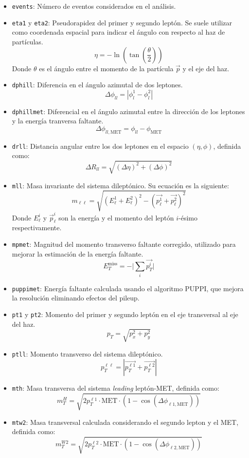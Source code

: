 \begin{itemize}
    \item[\ding{220}] \texttt{events}: Número de eventos considerados en el análisis.

    \item[\ding{220}] \texttt{eta1} y \texttt{eta2}: Pseudorapidez del primer y segundo leptón. Se suele utilizar como coordenada espacial para indicar el ángulo con respecto al haz de partículas. 
    $$
    \eta = -\ln \left( \tan \left( \frac{\theta}{2}\right) \right)
    $$
    Donde $\theta$ es el ángulo entre el momento de la partícula $\vec{p}$ y el eje del haz.
    \item[\ding{220}] \texttt{dphill}: Diferencia en el ángulo azimutal de dos leptones.
    $$
    \Delta \phi_{ll} = |\phi_l^1-\phi_l^2|
    $$
    \item[\ding{220}] \texttt{dphillmet}: Diferencial en el ángulo azimutal entre la dirección de los leptones y la energía tranversa faltante.
    $$
    \Delta \phi_{ll,\text{MET}} = \phi_{ll}-\phi_\text{MET}
    $$
    \item[\ding{220}] \texttt{drll}: Distancia angular entre los dos leptones en el espacio $(\eta, \phi)$, definida como:
    $$
    \Delta R_{ll} = \sqrt{(\Delta \eta)^2+(\Delta \phi)^2}
    $$
    \item[\ding{220}] \texttt{mll}: Masa invariante del sistema dileptónico. Su ecuación es la siguiente:
    $$
    m_{\ell \ell} = \sqrt{(E_{\ell}^1 + E_\ell^2)^2-(\vec{p_\ell^1}+\vec{p_\ell^2})^2}
    $$
    Donde $E_\ell^i$ y $\vec{p}_\ell^i$ son la energía y el momento del leptón $i$-ésimo respectivamente.
    \item[\ding{220}] \texttt{mpmet}:  Magnitud del momento transverso faltante corregido, utilizado para mejorar la estimación de la energía faltante.
    $$
    E_T^{\text{miss}} = -\Bigg| \sum_i \vec{p_T^i} \Bigg|
    $$
    \item[\ding{220}] \texttt{puppimet}: Energía faltante calculada usando el algoritmo PUPPI, que mejora la resolución eliminando efectos del pileup.
    \item[\ding{220}] \texttt{pt1} y \texttt{pt2}: Momento del primer y segundo leptón en el eje transversal al eje del haz.
    $$
    p_T = \sqrt{p_x^2+p_y^2}
    $$
    \item[\ding{220}] \texttt{ptll}: Momento transverso del sistema dileptónico.
    $$
    p_T^{\ell \ell} = |\vec{p_T^{\ell 1}} + \vec{p_T^{\ell 2}}|
    $$
    \item[\ding{220}] \texttt{mth}: Masa transversa del sistema \textit{leading} leptón-MET, definida como:
    $$
    m_T^H = \sqrt{2p_T^{\ell 1}\cdot \text{MET}\cdot (1-\cos(\Delta \phi_{\ell 1, \text{MET}}))}
    $$
    \item[\ding{220}] \texttt{mtw2}: Masa transversal calculada considerando el segundo lepton y el MET, definida como:
    $$
    m_T^{W2} = \sqrt{2p_T^{\ell 2}\cdot \text{MET}\cdot (1-\cos(\Delta \phi_{\ell 2, \text{MET}}))}
    $$
    

\end{itemize}
